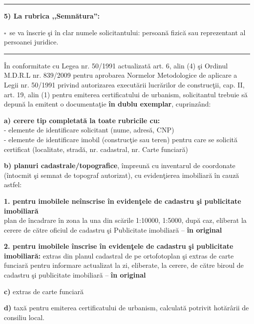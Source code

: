 \documentclass[11pt,a4paper]{article}
\newcommand{\checkboxempty}{$\square$}
\begin{document}
\vspace{0.3cm}
\hrule
\vspace{0.5cm}

\textbf{5) La rubrica ,,Semnătura'':}

\checkboxempty\ se va înscrie şi în clar numele solicitantului: persoană fizică sau reprezentant al persoanei juridice.

\vspace{0.4cm}
\hrule
\vspace{0.4cm}

În conformitate cu Legea nr. 50/1991 actualizată art. 6, alin (4) şi Ordinul M.D.R.L nr. 839/2009 pentru aprobarea Normelor Metodologice de aplicare a Legii nr. 50/1991 privind autorizarea executării lucrărilor de construcţii, cap. II, art. 19, alin (1) pentru emiterea certificatului de urbanism, solicitantul trebuie să depună la emitent o documentaţie \textbf{în dublu exemplar}, cuprinzând:

\vspace{0.3cm}

\textbf{a) cerere tip completată la toate rubricile cu:}\\
- elemente de identificare solicitant (nume, adresă, CNP)\\
- elemente de identificare imobil (construcţie sau teren) pentru care se solicită certificat (localitate, stradă, nr. cadastral, nr. Carte funciară)

\vspace{0.2cm}

\textbf{b) planuri cadastrale/topografice}, împreună cu inventarul de coordonate (întocmit şi semnat de topograf autorizat), cu evidenţierea imobiliară în cauză astfel:

\textbf{1. pentru imobilele neînscrise în evidenţele de cadastru şi publicitate imobiliară}\\
plan de încadrare în zona la una din scările 1:10000, 1:5000, după caz, eliberat la cerere de către oficiul de cadastru şi Publicitate imobiliară -- \textbf{în original}

\textbf{2. pentru imobilele înscrise în evidenţele de cadastru şi publicitate imobiliară:} extras din planul cadastral de pe ortofotoplan şi extras de carte funciară pentru informare actualizat la zi, eliberate, la cerere, de către biroul de cadastru şi publicitate imobiliară -- \textbf{în original}

\textbf{c)} extras de carte funciară

\textbf{d)} taxă pentru emiterea certificatului de urbanism, calculată potrivit hotărârii de consiliu local.
\end{document}
